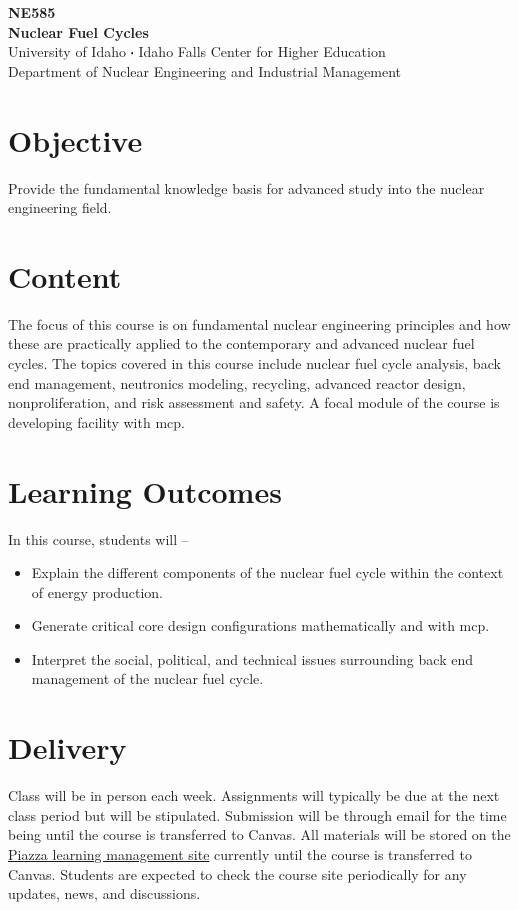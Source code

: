 \documentclass[11pt,letterpaper]{article}
\newcommand*\sq{\mathbin{\vcenter{\hbox{\rule{.3ex}{.3ex}}}}} %
\newcommand{\acs}{\acrshort} %
\begin{document}
{\centering 
    \textbf{NE585\\
    Nuclear Fuel Cycles\\
    }
    University of Idaho $\sq$ Idaho Falls Center for Higher Education\\
    Department of Nuclear Engineering and Industrial Management
\par
}


\noindent\makebox[\linewidth]{\rule{\textwidth}{0.5pt}} %


\section{Objective}
Provide the fundamental knowledge basis for advanced study into the nuclear engineering field.


\section{Content}
The focus of this course is on fundamental nuclear engineering principles and how these are practically applied to the contemporary and advanced nuclear fuel cycles. The topics covered in this course include nuclear fuel cycle analysis, back end management, neutronics modeling, recycling, advanced reactor design, nonproliferation, and risk assessment and safety. A focal module of the course is developing facility with \acs{mcp}.


\section{Learning Outcomes}
In this course, students will --
\begin{itemize}[begin-vspace=0ex,item-vspace=-0.5ex,begin-extra-vspace=1ex,para-vspace=1ex,left-margin=2.25ex,item-indent=0ex]
    \item Explain the different components of the nuclear fuel cycle within the context of energy production.
    \item Generate critical core design configurations mathematically and with \acs{mcp}.
    \item Interpret the social, political, and technical issues surrounding back end management of the nuclear fuel cycle. 
\end{itemize}


\section{Delivery}
Class will be in person each week. Assignments will typically be due at the next class period but will be stipulated. Submission will be through email for the time being until the course is transferred to Canvas. All materials will be stored on the \href{https://piazza.com/}{Piazza learning management site} currently until the course is transferred to Canvas. Students are expected to check the course site periodically for any updates, news, and discussions. 
\end{document}
